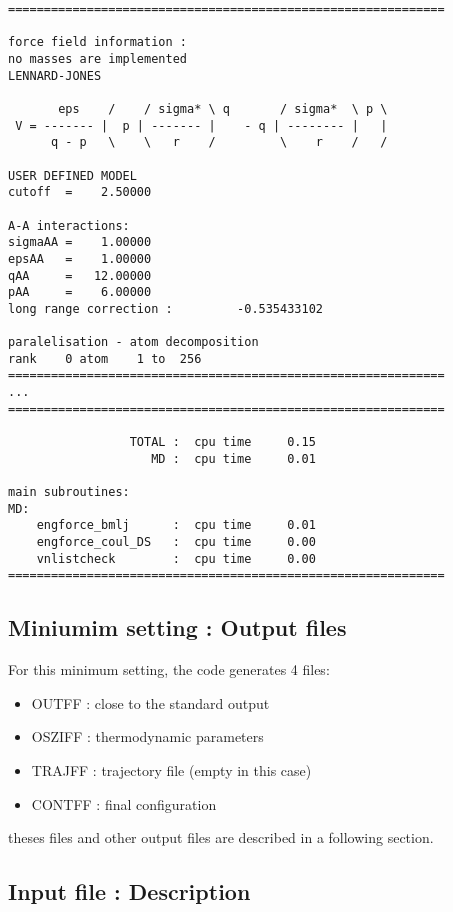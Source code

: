 \documentclass[10pt,a4paper]{article}
\begin{document}
\begin{verbatim}
=============================================================

force field information :                      
no masses are implemented                      
LENNARD-JONES                  

       eps    /    / sigma* \ q       / sigma*  \ p \
 V = ------- |  p | ------- |    - q | -------- |   |
      q - p   \    \   r    /         \    r    /   /

USER DEFINED MODEL                             
cutoff  =    2.50000

A-A interactions:
sigmaAA =    1.00000
epsAA   =    1.00000
qAA     =   12.00000
pAA     =    6.00000
long range correction :         -0.535433102
 
paralelisation - atom decomposition
rank    0 atom    1 to  256
=============================================================
...
=============================================================

                 TOTAL :  cpu time     0.15
                    MD :  cpu time     0.01

main subroutines:
MD:
    engforce_bmlj      :  cpu time     0.01
    engforce_coul_DS   :  cpu time     0.00
    vnlistcheck        :  cpu time     0.00
=============================================================
\end{verbatim}

\subsection{Miniumim setting : Output files}
For this minimum setting, the code generates 4 files:

\begin{itemize}
\item OUTFF  : close to the standard output
\item OSZIFF : thermodynamic parameters 
\item TRAJFF : trajectory file (empty in this case) 
\item CONTFF : final configuration
\end{itemize}
theses files and other output files are described in a following section.

\subsection{Input file : Description}

\end{document}
